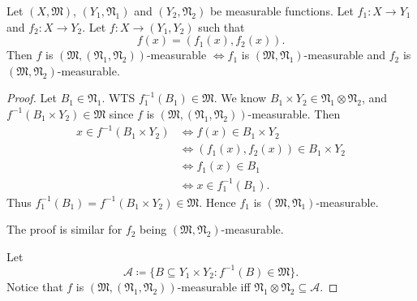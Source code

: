 \documentclass[notoc,notitlepage]{tufte-book}
\begin{document}
\begin{propo}\label{propo:component_wise_measurability_of_functions}
  Let $(X, \mathfrak{M})$, $(Y_1, \mathfrak{N}_1)$
  and $(Y_2, \mathfrak{N}_2)$ be measurable functions.
  Let $f_1 : X \to Y_1$ and $f_2 : X \to Y_2$.
  Let $f : X \to (Y_1, Y_2)$ such that
  \begin{equation*}
    f(x) = (f_1(x), f_2(x)).
  \end{equation*}
  Then $f$ is $(\mathfrak{M}, (\mathfrak{N}_1, \mathfrak{N}_2))$-measurable
  $\iff f_1$ is $(\mathfrak{M}, \mathfrak{N}_1)$-measurable and
  $f_2$ is $(\mathfrak{M}, \mathfrak{N}_2)$-measurable.
\end{propo}

\begin{proof}
  \hlbnoted{$(\implies)$}
  Let $B_1 \in \mathfrak{N}_1$.  WTS $f_1^{-1}(B_1) \in \mathfrak{M}$.
  We know $B_1 \times Y_2 \in \mathfrak{N}_1 \otimes \mathfrak{N}_2$,
  and $f^{-1}(B_1 \times Y_2) \in \mathfrak{M}$
  since $f$ is $(\mathfrak{M}, (\mathfrak{N}_1, \mathfrak{N}_2))$-measurable.
  Then
  \begin{align*}
    x \in f^{-1}(B_1 \times Y_2)
    &\iff f(x) \in B_1 \times Y_2 \\
    &\iff (f_1(x), f_2(x)) \in B_1 \times Y_2 \\
    &\iff f_1(x) \in B_1 \\
    &\iff x \in f_1^{-1}(B_1).
  \end{align*}
  Thus $f_1^{-1}(B_1) = f^{-1}(B_1 \times Y_2) \in \mathfrak{M}$.
  Hence $f_1$ is $(\mathfrak{M}, \mathfrak{N}_1)$-measurable.
  
  The proof is similar for $f_2$ being
  $(\mathfrak{M}, \mathfrak{N}_2)$-measurable.

  \noindent
  \hlbnoted{$(\impliedby)$}
  Let
  \begin{equation*}
    \mathcal{A} \coloneqq \{ B \subseteq Y_1 \times Y_2
          : f^{-1}(B) \in \mathfrak{M} \}.
  \end{equation*}
  Notice that
  $f$ is $(\mathfrak{M}, (\mathfrak{N}_1, \mathfrak{N}_2))$-measurable
  iff $\mathfrak{N}_1 \otimes \mathfrak{N}_2 \subseteq \mathcal{A}$.


\end{proof}
\end{document}

